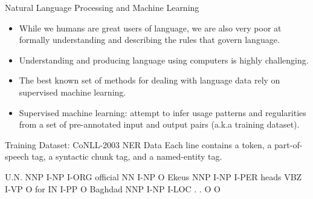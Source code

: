 \documentclass[handout]{beamer}
\begin{document}
\begin{frame}{Natural Language Processing and Machine Learning}
\begin{scriptsize}
\begin{itemize}

\item While we humans are great users of language, we are also very poor at formally understanding and describing the rules that govern  language.

\item  Understanding and producing language using computers is highly challenging.
\item The best known set of methods for dealing with language data rely on supervised machine learning.
\item Supervised machine learning: attempt to infer usage patterns and regularities from a set of pre-annotated input and output pairs (a.k.a training dataset).

\end{itemize}
\end{scriptsize}
\end{frame}


\begin{frame}[fragile]{Training Dataset: CoNLL-2003 NER Data}
Each line contains a token, a part-of-speech tag, a syntactic chunk tag, and a named-entity tag.
\begin{center}
\begin{semiverbatim}
U.N.         NNP  I-NP  I-ORG 
official     NN   I-NP  O
Ekeus        NNP  I-NP  I-PER
heads        VBZ  I-VP  O
for          IN   I-PP  O
Baghdad      NNP  I-NP  I-LOC
.            .    O     O
\end{semiverbatim}
\end{center}


\end{frame}
\end{document}
